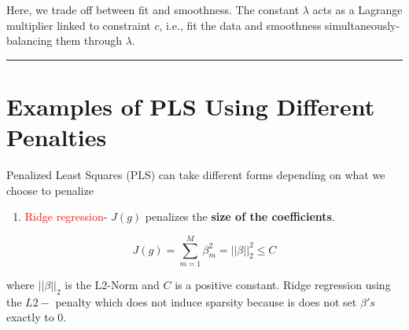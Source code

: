 \documentclass[
  letterpaper,
  DIV=11,
  numbers=noendperiod]{scrreprt}
\providecommand{\tightlist}{%
  \setlength{\itemsep}{0pt}\setlength{\parskip}{0pt}}\usepackage{longtable,booktabs,array}
\begin{document}
Here, we trade off between fit and smoothness. The constant \(\lambda\)
acts as a Lagrange multiplier linked to constraint \(c\), i.e., fit the
data and smoothness simultaneously-balancing them through \(\lambda\).

\begin{center}\rule{0.5\linewidth}{0.5pt}\end{center}

\hypertarget{examples-of-pls-using-different-penalties}{%
\section*{Examples of PLS Using Different
Penalties}\label{examples-of-pls-using-different-penalties}}


Penalized Least Squares (PLS) can take different forms depending on what
we choose to penalize

\begin{enumerate}
\def\labelenumi{\Roman{enumi}.}
\tightlist
\item
  \textcolor{red}{Ridge regression}- \(J(g)\) penalizes the \textbf{size
  of the coefficients}.
\end{enumerate}

\[
J(g) = \sum_{m=1}^M \beta_m^2 = ||\beta||_2^2 \leq C
\]

where \(||\beta||_2\) is the L2-Norm and \(C\) is a positive constant.
Ridge regression using the \(L2-\) penalty which does not induce
sparsity because is does not set \(\beta's\) exactly to 0.
\end{document}
